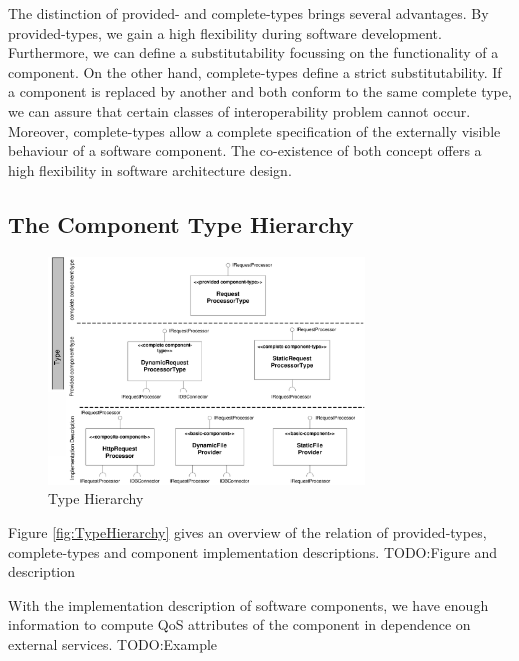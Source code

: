 The distinction of provided- and complete-types brings several advantages. By
provided-types, we gain a high flexibility during software development.
Furthermore, we can define a substitutability focussing on the functionality of
a component. On the other hand, complete-types define a strict substitutability.
If a component is replaced by another and both conform to the same complete
type, we can assure that certain classes of interoperability problem cannot
occur. Moreover, complete-types allow a complete specification of the externally
visible behaviour of a software component. The co-existence of both concept
offers a high flexibility in software architecture design.

\subsection{The Component Type Hierarchy}

\begin{figure}[htbp]
\centering
\includegraphics[width=3.3in]{example/TypeHierachy}
\caption{Type Hierarchy}
\label{fig:WebserverComponents}
\end{figure}

Figure \ref{fig:TypeHierarchy} gives an overview of the relation of
provided-types, complete-types and component implementation descriptions.
TODO:Figure and description

With the implementation description of software components, we have enough
information to compute QoS attributes of the component in dependence on external
services.
TODO:Example

